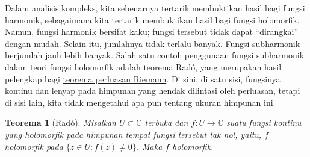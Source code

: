 \documentclass[12pt,openany]{book}
\newcommand{\C}{{\mathbb{C}}}
\newcommand{\myquote}[1]{``#1''}
\theoremstyle{plain}
\newtheorem{thm}{Teorema}[section]
\theoremstyle{remark}
\theoremstyle{definition}
\theoremstyle{exercise}
\theoremstyle{example}
\begin{document}
Dalam analisis kompleks,
kita sebenarnya tertarik membuktikan hasil bagi fungsi harmonik,
sebagaimana kita tertarik membuktikan hasil bagi fungsi holomorfik.
Namun, fungsi harmonik bersifat kaku; fungsi tersebut tidak dapat
\myquote{dirangkai} dengan mudah.
Selain itu, jumlahnya tidak terlalu banyak.  Fungsi subharmonik berjumlah jauh
lebih banyak.
Salah satu contoh penggunaan fungsi subharmonik dalam
teori fungsi holomorfik adalah teorema 
Rad\'o, yang merupakan hasil pelengkap bagi
\hyperref[thm:riemannext]{teorema perluasan Riemann}.
Di sini, di satu sisi, fungsinya
kontinu dan lenyap pada himpunan yang hendak dilintasi oleh perluasan, tetapi di
sisi lain, kita tidak mengetahui apa pun tentang ukuran himpunan ini.

\begin{thm}[Rad\'o]\label{thm:rado}
Misalkan $U \subset \C$ terbuka dan $f \colon U \to \C$ suatu fungsi kontinu
yang holomorfik pada himpunan tempat fungsi tersebut tak nol, yaitu,
$f$ holomorfik pada $\bigl\{ z \in U : f(z) \neq 0 \bigr\}$.
Maka $f$ holomorfik.
\end{thm}
\end{document}
